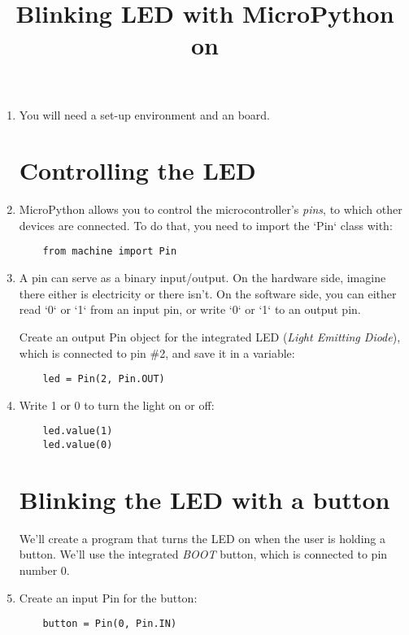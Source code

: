 \documentclass{../tutorial}
\title{Blinking LED with MicroPython on \abbr{ESP32}}
\begin{document}
\begin{enumerate}

\item
    You will need a set-up environment and an  board.

\section{Controlling the LED}

\item
    MicroPython allows you to control the microcontroller's \emph{pins},
    to which other devices are connected.
    To do that, you need to import the `Pin` class with:

    \begin{lstlisting}
    from machine import Pin
    \end{lstlisting}

\item
    A pin can serve as a binary input/output.
    On the hardware side, imagine there either is electricity or there isn't.
    On the software side, you can either read `0` or `1` from an
    input pin, or write `0` or `1` to an output pin.

    Create an output Pin object for the integrated LED (\emph{Light Emitting Diode}),
    which is connected to pin \#2, and save it in a variable:

    \begin{lstlisting}
    led = Pin(2, Pin.OUT)
    \end{lstlisting}

\item
    Write 1 or 0 to turn the light on or off:

    \begin{lstlisting}
    led.value(1)
    led.value(0)
    \end{lstlisting}

\section{Blinking the LED with a button}

    We'll create a program that turns the LED on when the user is holding a button.
    We'll use the integrated \emph{BOOT} button, which is connected to pin number 0.

\item
    Create an input Pin for the button:

    \begin{lstlisting}
    button = Pin(0, Pin.IN)
    \end{lstlisting}


\end{enumerate}
\end{document}
